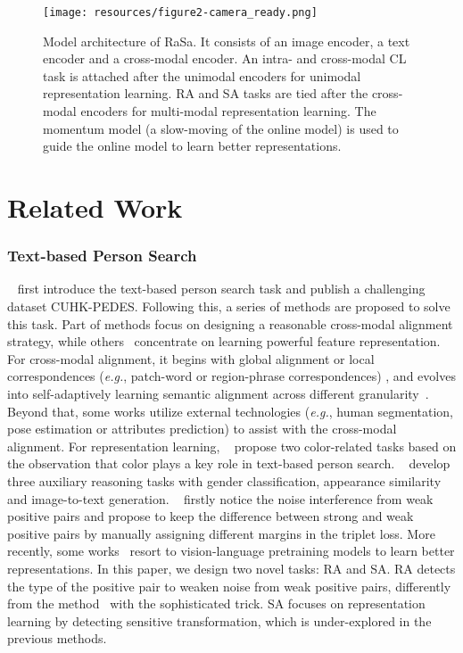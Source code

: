 \documentclass{article}
\begin{document}
\begin{figure*}[htp]
\setlength{\belowcaptionskip}{0.2cm}
\centering
\texttt{[image: resources/figure2-camera\_ready.png]}
\caption{Model architecture of RaSa. It consists of an image encoder, a text encoder and a cross-modal encoder.
An intra- and cross-modal CL task is attached after the unimodal encoders for unimodal representation learning. RA and SA tasks are tied after the cross-modal encoders for multi-modal representation learning. The momentum model (a slow-moving of the online model) is used to guide the online model to learn better representations.}
\label{fig2}
\end{figure*}

\section{Related Work}
\subsubsection{Text-based Person Search}
\citeauthor{li2017person}~ first introduce the text-based person search task and publish a challenging dataset CUHK-PEDES. Following this, a series of methods are proposed to solve this task.
Part of methods \cite{zheng2020hierarchical,wang2021text} focus on designing a reasonable cross-modal alignment strategy, 
while others~\cite{zhang2018deep,shao2022learning} concentrate on learning powerful feature representation. 
For cross-modal alignment,
it begins with global alignment \cite{zheng2020dual} or local correspondences (\emph{e.g.}, patch-word or region-phrase correspondences) \cite{chen2022tipcb,niu2020improving}, and evolves into self-adaptively learning semantic alignment across different granularity~\cite{li2022learning,gao2021contextual}. 
Beyond that, some works \cite{wang2020vitaa,zhu2021dssl} utilize external technologies (\emph{e.g.}, human segmentation, pose estimation or attributes prediction) to assist with the cross-modal alignment.
For representation learning,
\citeauthor{wu2021lapscore}~ propose two color-related tasks based on the observation that color plays a key role in text-based person search.
\citeauthor{zeng2021relation}~ develop three auxiliary reasoning tasks with gender classification, appearance similarity and image-to-text generation.
\citeauthor{ding2021semantically}~ firstly notice the noise interference from weak positive pairs and propose to keep the difference between strong and weak positive pairs by manually assigning different margins in the triplet loss.
More recently, some works~\cite{han2021textreid,shu2022see,yan2022clip} resort to vision-language pretraining models to learn better representations.
In this paper, we design two novel tasks: RA and SA.
RA detects the type of the positive pair to weaken noise from weak positive pairs, differently from the method~\cite{ding2021semantically} with the sophisticated trick.
SA focuses on representation learning by detecting sensitive transformation, which is under-explored in the previous methods.
\end{document}
